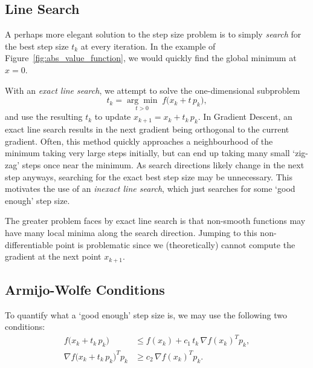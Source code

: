 \documentclass{article}
\begin{document}
\subsection{Line Search}

A perhaps more elegant solution to the step size problem
is to simply \emph{search} for the best step size $t_k$
at every iteration.
In the example of Figure~\ref{fig:abs_value_function},
we would quickly find the global minimum at $x = 0$.





With an \emph{exact line search}, we attempt to solve the one-dimensional
subproblem
\begin{equation}
    t_k = \underset{t > 0}{\arg\min} \; f\bigl(x_k + t\, p_k\bigr),
\end{equation}
and use the resulting $t_k$ to update $x_{k+1} = x_k + t_k\, p_k$.
In Gradient Descent, an exact line search results in the
next gradient being orthogonal to the current gradient.
Often, this method quickly approaches a neighbourhood of the minimum
taking very large steps initially, but can end up
taking many small
`zig-zag' steps once near the minimum.
As search directions likely change in the next step anyways,
searching for the exact best step size may be unnecessary.
This motivates the use of an \emph{inexact line search},
which just searches for some `good enough' step size.

The greater problem faces by exact line search is that
non-smooth functions may have many local minima
along the search direction.
Jumping to this non-differentiable point is problematic
since we (theoretically) cannot compute the gradient at
the next point $x_{k+1}$.

\subsection{Armijo-Wolfe Conditions}
To quantify what a `good enough' step size is, we may use
the following two conditions:
\begin{align}
    f\bigl(x_k + t_k\,p_k\bigr)              & \le f(x_k)
    + c_1\, t_k \,\nabla f(x_k)^T p_k, \tag{Armijo}                                       \\[6pt]
    \nabla f\bigl(x_k + t_k\,p_k\bigr)^T p_k & \ge c_2 \,\nabla f(x_k)^T p_k. \tag{Wolfe}
\end{align}
\end{document}
